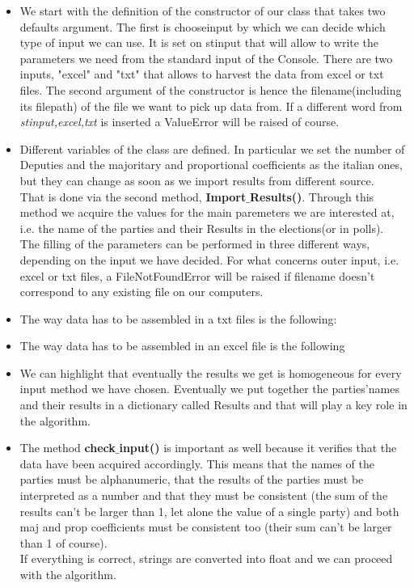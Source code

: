 \documentclass[12pt,a4paper,openright]{report}
\begin{document}
\begin{itemize}
	

\item We start with the definition of the constructor of our class that takes two defaults argument. The first is chooseinput by which we can decide which type of input we can use. It is set on stinput that will allow to write the parameters we need from the standard input of the Console. There are two inputs, "excel" and "txt" that allows to harvest the data from excel or txt files. The second argument of the constructor is hence the filename(including its filepath) of the file we want to pick up data from.
If a different word from \textit{stinput,excel,txt} is inserted a ValueError will be raised of course.\\
\item Different variables of the class are defined. In particular we set the number of Deputies and the majoritary and proportional coefficients as the italian ones, but they can change as soon as we import results from different source.\\
That is done via the second method, \textbf{Import$\_$Results()}. Through this method we acquire the values for the main paremeters we are interested at, i.e. the name of the parties and their Results in the elections(or in polls).\\
The filling of the parameters can be performed in three different ways, depending on the input we have decided. For what concerns outer input, i.e. excel or txt files, a FileNotFoundError will be raised if filename doesn't correspond to any existing file  on our computers.\\
\item The way data has to be assembled in a txt files is the following:
\item The way data has to be assembled in an excel file is the following
\item We can highlight that eventually the results we get is homogeneous for every input method we have chosen. Eventually we put together the parties'names and their results in a dictionary called Results and that will play a key role in the algorithm.
\item The method \textbf{check$\_$input()} is important as well because it verifies that the data have been acquired accordingly. This means that the names of the parties must be alphanumeric, that the results of the parties must be interpreted as a number and that they must be consistent (the sum of the results can't be larger than 1, let alone the value of a single party) and both maj and prop coefficients must be consistent too (their sum can't be larger than 1 of course).\\
If everything is correct, strings are converted into float and we can proceed with the algorithm.


\end{itemize}
\end{document}
